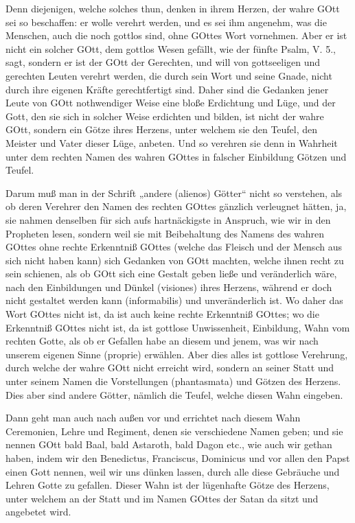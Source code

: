 Denn diejenigen, welche solches thun, denken in ihrem Herzen, der wahre GOtt sei so beschaffen: er wolle verehrt werden, und es sei ihm angenehm, was die Menschen, auch die noch gottlos sind, ohne GOttes Wort vornehmen. Aber er ist nicht ein solcher GOtt, dem gottlos Wesen gefällt, wie der fünfte Psalm, V. 5., sagt, sondern er ist der GOtt der Gerechten, und will von gottseeligen und gerechten Leuten verehrt werden, die durch sein Wort und seine Gnade, nicht durch ihre eigenen Kräfte gerechtfertigt sind. Daher sind die Gedanken jener Leute von GOtt nothwendiger Weise eine bloße Erdichtung und Lüge, und der Gott, den sie sich in solcher Weise erdichten und bilden, ist nicht der wahre GOtt,
sondern ein Götze ihres Herzens, unter welchem sie den Teufel, den Meister und Vater dieser Lüge, anbeten. Und so verehren sie denn in Wahrheit unter dem rechten Namen des wahren GOttes in falscher Einbildung Götzen und Teufel.

Darum muß man in der Schrift „andere (alienos) Götter“ nicht so verstehen, als ob deren Verehrer den Namen des rechten GOttes gänzlich verleugnet hätten, ja, sie nahmen denselben für sich aufs hartnäckigste in Anspruch, wie wir in den Propheten lesen, sondern weil sie mit Beibehaltung des Namens des wahren GOttes ohne rechte Erkenntniß GOttes (welche das Fleisch und der Mensch aus sich nicht haben kann) sich Gedanken von GOtt machten, welche ihnen recht zu sein schienen, als ob GOtt sich eine Gestalt geben ließe und veränderlich wäre, nach den Einbildungen und Dünkel (visiones) ihres Herzens, während er doch nicht gestaltet werden kann (informabilis) und unveränderlich ist. Wo daher das Wort GOttes nicht ist, da ist auch keine rechte Erkenntniß GOttes; wo die Erkenntniß GOttes nicht ist, da ist gottlose Unwissenheit, Einbildung, Wahn vom rechten Gotte, als ob er Gefallen habe an diesem und jenem, was wir nach unserem eigenen Sinne (proprie) erwählen. Aber dies alles ist gottlose Verehrung, durch welche der wahre GOtt nicht erreicht wird, sondern an seiner Statt und unter seinem Namen die Vorstellungen (phantasmata) und Götzen des Herzens. Dies aber sind andere Götter, nämlich die Teufel, welche diesen Wahn eingeben.

Dann geht man auch nach außen vor und errichtet nach diesem Wahn Ceremonien, Lehre und Regiment, denen sie verschiedene Namen geben; und sie nennen GOtt bald Baal, bald Astaroth, bald Dagon etc., wie auch wir gethan haben, indem wir den Benedictus, Franciscus, Dominicus und vor allen den Papst einen Gott nennen, weil wir uns dünken lassen, durch alle diese Gebräuche und Lehren Gotte zu gefallen. Dieser Wahn ist der lügenhafte Götze des Herzens, unter welchem an der Statt und im Namen GOttes der Satan da sitzt und angebetet wird.

